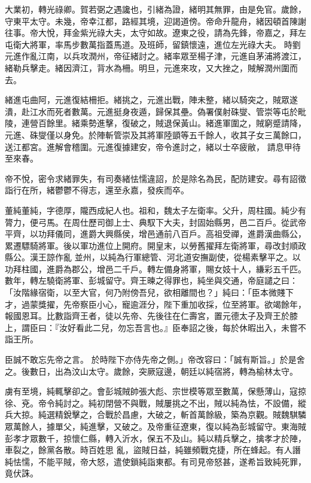 \begin{pinyinscope}
 大業初，轉光祿卿。賀若弼之遇讒也，引緒為證，緒明其無罪，由是免官。歲餘，守東平太守。未幾，帝幸江都，路經其境，迎謁道傍。帝命升龍舟，緒因頓首陳謝往事。帝大悅，拜金紫光祿大夫，太守如故。遼東之役，請為先鋒，帝嘉之，拜左屯衛大將軍，率馬步數萬指蓋馬道。及班師，留鎮懷遠，進位左光祿大夫。
 時劉元進作亂江南，以兵攻潤州，帝征緒討之。緒率眾至楊子津，元進自茅浦將渡江，緒勒兵擊走。緒因濟江，背水為柵。明旦，元進來攻，又大挫之，賊解潤州圍而去。



 緒進屯曲阿，元進復結柵拒。緒挑之，元進出戰，陣未整，緒以騎突之，賊眾遂潰，赴江水而死者數萬。元進挺身夜遁，歸保其壘。偽署僕射硃燮、管崇等屯於毗陵，連營百餘里。緒乘勢進擊，復破之，賊退保黃山。緒進軍圍之，賊窮蹙請降，元進、硃燮僅以身免。於陣斬管崇及其將軍陸顗等五千餘人，收其子女三萬餘口，送江都宮。進解會稽圍。元進復據建安，帝令進討之，緒以士卒疲敝，
 請息甲待至來春。



 帝不悅，密令求緒罪失，有司奏緒怯懦違詔，於是除名為民，配防建安。尋有詔徵詣行在所，緒鬱鬱不得志，還至永嘉，發疾而卒。



 董純董純，字德厚，隴西成紀人也。祖和，魏太子左衛率。父升，周柱國。純少有膂力，便弓馬。在周仕歷司御上士、典馭下大夫，封固始縣男，邑二百戶。從武帝平齊，以功拜儀同，進爵大興縣侯，增邑通前八百戶。高祖受禪，進爵漢曲縣公，累遷驃騎將軍。後以軍功進位上開府。開皇末，以勞舊擢拜左衛將軍，尋改封順政縣公。漢王諒作亂
 並州，以純為行軍總管、河北道安撫副使，從楊素擊平之。以功拜柱國，進爵為郡公，增邑二千戶。轉左備身將軍，賜女妓十人，縑彩五千匹。數年，轉左驍衛將軍、彭城留守。齊王暕之得罪也，純坐與交通，帝庭譴之曰：「汝階緣宿衛，以至大官，何乃附傍吾兒，欲相離間也？」純曰：「臣本微賤下才，過蒙獎擢，先帝察臣小心，寵逾涯分，陛下重加收採，位至將軍。欲竭餘年，報國恩耳。比數詣齊王者，徒以先帝、先後往在仁壽宮，置元德太子及齊王於膝上，謂臣曰：『汝好看此二兒，勿忘吾言也。』臣奉詔之後，每於休暇出入，未嘗不詣王所。



 臣誠不敢忘先帝之言。
 於時陛下亦侍先帝之側。」帝改容曰：「誠有斯旨。」於是舍之。後數日，出為汶山太守。歲餘，突厥寇邊，朝廷以純宿將，轉為榆林太守。



 虜有至境，純輒擊卻之。會彭城賊帥張大彪、宗世模等眾至數萬，保懸薄山，寇掠徐、兗。帝令純討之。純初閉營不與戰，賊屢挑之不出，賊以純為怯，不設備，縱兵大掠。純選精銳擊之，合戰於昌慮，大破之，斬首萬餘級，築為京觀。賊魏騏驎眾萬餘人，據單父，純進擊，又破之。及帝重征遼東，復以純為彭城留守。東海賊彭孝才眾數千，掠懷仁縣，轉入沂水，保五不及山。純以精兵擊之，擒孝才於陣，車裂之，餘黨各散。時百姓思
 亂，盜賊日益，純雖頻戰克捷，所在蜂起。有人譖純怯懦，不能平賊，帝大怒，遣使鎖純詣東都。有司見帝怒甚，遂希旨致純死罪，竟伏誅。




\end{pinyinscope}
